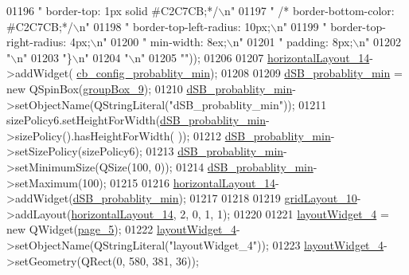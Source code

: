 \begin{DoxyCode}
01196 \textcolor{stringliteral}{" border-top: 1px solid #C2C7CB;*/\(\backslash\)n"}
01197 \textcolor{stringliteral}{"   /*  border-bottom-color: #C2C7CB;*/\(\backslash\)n"}
01198 \textcolor{stringliteral}{"     border-top-left-radius: 10px;\(\backslash\)n"}
01199 \textcolor{stringliteral}{"     border-top-right-radius: 4px;\(\backslash\)n"}
01200 \textcolor{stringliteral}{"     min-width: 8ex;\(\backslash\)n"}
01201 \textcolor{stringliteral}{"     padding: 8px;\(\backslash\)n"}
01202 \textcolor{stringliteral}{"\(\backslash\)n"}
01203 \textcolor{stringliteral}{"\}\(\backslash\)n"}
01204 \textcolor{stringliteral}{"\(\backslash\)n"}
01205 \textcolor{stringliteral}{""}));
01206 
01207         \hyperlink{a00027_aa53955f35b7d9f3d161525ed8639db84}{horizontalLayout\_14}->addWidget(
      \hyperlink{a00027_a6e32cc42adcf308df94cbbc9ac226f50}{cb\_config\_probablity\_min});
01208 
01209         \hyperlink{a00027_adfd6cf470c736f358c6982f9a635f04f}{dSB\_probablity\_min} = \textcolor{keyword}{new} QSpinBox(\hyperlink{a00027_ab492988d340548c7f30e098419ef10ee}{groupBox\_9});
01210         \hyperlink{a00027_adfd6cf470c736f358c6982f9a635f04f}{dSB\_probablity\_min}->setObjectName(QStringLiteral(\textcolor{stringliteral}{"dSB\_probablity\_min"}));
01211         sizePolicy6.setHeightForWidth(\hyperlink{a00027_adfd6cf470c736f358c6982f9a635f04f}{dSB\_probablity\_min}->sizePolicy().hasHeightForWidth(
      ));
01212         \hyperlink{a00027_adfd6cf470c736f358c6982f9a635f04f}{dSB\_probablity\_min}->setSizePolicy(sizePolicy6);
01213         \hyperlink{a00027_adfd6cf470c736f358c6982f9a635f04f}{dSB\_probablity\_min}->setMinimumSize(QSize(100, 0));
01214         \hyperlink{a00027_adfd6cf470c736f358c6982f9a635f04f}{dSB\_probablity\_min}->setMaximum(100);
01215 
01216         \hyperlink{a00027_aa53955f35b7d9f3d161525ed8639db84}{horizontalLayout\_14}->addWidget(\hyperlink{a00027_adfd6cf470c736f358c6982f9a635f04f}{dSB\_probablity\_min});
01217 
01218 
01219         \hyperlink{a00027_a79b264e6945e3b94a511427b1c270dd7}{gridLayout\_10}->addLayout(\hyperlink{a00027_aa53955f35b7d9f3d161525ed8639db84}{horizontalLayout\_14}, 2, 0, 1, 1);
01220 
01221         \hyperlink{a00027_ac4725768128006ab5bea6e58b67959d0}{layoutWidget\_4} = \textcolor{keyword}{new} QWidget(\hyperlink{a00027_a421261d29369be60b551aabe8b097597}{page\_5});
01222         \hyperlink{a00027_ac4725768128006ab5bea6e58b67959d0}{layoutWidget\_4}->setObjectName(QStringLiteral(\textcolor{stringliteral}{"layoutWidget\_4"}));
01223         \hyperlink{a00027_ac4725768128006ab5bea6e58b67959d0}{layoutWidget\_4}->setGeometry(QRect(0, 580, 381, 36));

\end{DoxyCode}
